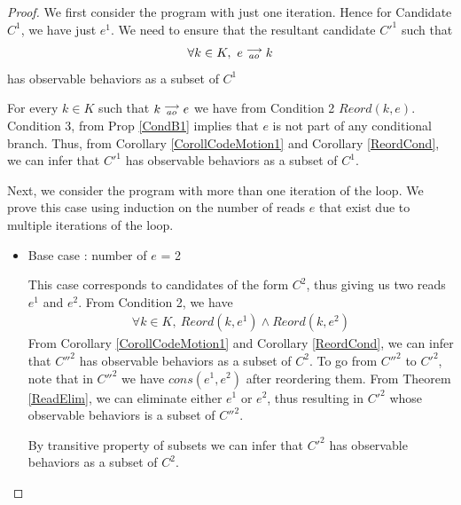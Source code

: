             \begin{proof}

                We first consider the program with just one iteration. Hence for Candidate $C^1$, we have just $e^1$. 
                We need to ensure that the resultant candidate $C'^1$ such that 
                \begin{align*}
                    \forall k \in K, \ e\stackrel{\longrightarrow}{_{ao}}k
                \end{align*}  
                has observable behaviors as a subset of $C^1$

                For every $k \in K$ such that $k\stackrel{\longrightarrow}{_{ao}}e$ we have from Condition 2 $Reord(k,e)$. 
                Condition 3, from Prop \ref{CondB1} implies that $e$ is not part of any conditional branch.
                Thus, from Corollary \ref{CorollCodeMotion1} and Corollary \ref{ReordCond}, we can infer that $C'^1$ has observable behaviors as a subset of $C^1$. 
                
                Next, we consider the program with more than one iteration of the loop. 
                We prove this case using induction on the number of reads $e$ that exist due to multiple iterations of the loop. 

                \begin{itemize}

                    \item Base case : number of $e$ = 2
                
                    This case corresponds to candidates of the form $C^2$, thus giving us two reads $e^1$ and $e^2$.
                    From Condition 2, we have
                    \begin{align*}
                        \forall k \in K, \ Reord(k,e^1) \wedge Reord(k, e^2)
                    \end{align*} 
                    From Corollary \ref{CorollCodeMotion1} and Corollary \ref{ReordCond}, we can infer that $C''^2$ has observable behaviors as a subset of $C^2$.
                    To go from $C''^2$ to $C'^2$, note that in $C''^2$ we have $cons(e^1, e^2)$ after reordering them. 
                    From Theorem \ref{ReadElim}, we can eliminate either $e^1$ or $e^2$, thus resulting in $C'^2$ whose observable behaviors is a subset of $C''^2$.
                    
                    By transitive property of subsets we can infer that $C'^2$ has observable behaviors as a subset of $C^2$.
                    

\end{itemize}
\end{proof}
